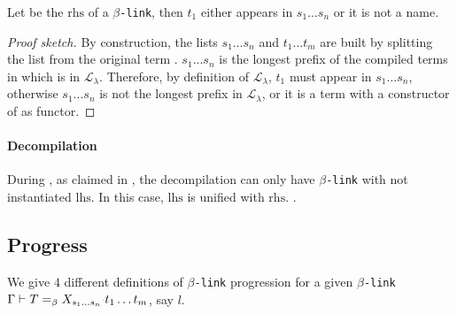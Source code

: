 \documentclass[sigconf,natbib=false,review]{acmart}
\newcommand{\llambda}{\ensuremath{\mathcal{L}_\lambda}\xspace}
\newcommand{\linkMacro}[1]{\ensuremath{#1}\texttt{-link}\xspace}
\newcommand{\linkbeta}{\linkMacro{\beta}}
\newcommand{\linkbetaM}[3]{\ensuremath{#1 \vdash #2 =_\beta #3}}
\newcommand{\lhs}{\ensuremath{\mathrm{lhs}}\xspace}
\newcommand{\rhs}{\ensuremath{\mathrm{rhs}}\xspace}
\begin{document}
\begin{corollary}
  Let \rhsBeta be the \rhs of a \linkbeta, then $t_1$ either appears in $s_1\dots s_n$ or it is 
  not a name.
\end{corollary}

\begin{proof}[Proof sketch]
  By construction, the lists $s_1\dots s_n$ and $t_1\dots t_m$ are built by splitting
  the list  from the original term .
  $s_1\dots s_n$ is the longest prefix of the compiled terms in  which is
  in \llambda. Therefore, by definition of \llambda, $t_1$ must appear  
  in $s_1\dots s_n$, otherwise $s_1\dots s_n$ is not the longest prefix in
  \llambda, or it is a term with a constructor of  as functor.  
\end{proof}

\paragraph{Decompilation}
During , as claimed in , the decompilation
can only have \linkbeta with not instantiated \lhs. In this case, \lhs is
unified with \rhs.
.

\subsection{Progress}

\newcommand{\progBetaLL}{\emph{progress-beta-\llambda}\xspace}
\newcommand{\progBetaRH}{\emph{progress-beta-rigid-\rhs}\xspace}
\newcommand{\progBetaDedup}{\emph{progress-beta-dedup}\xspace}
\newcommand{\progBetaLH}{\emph{progress-beta-rigid-\lhs}\xspace}

We give $4$ different definitions of \linkbeta progression for a given \linkbeta
\linkbetaM{\Gamma}{T}{\rhsBeta}, say $l$.
\end{document}
